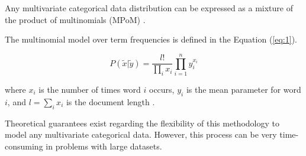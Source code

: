 Any multivariate categorical data distribution can be expressed as a mixture of the product of multinomials (MPoM) \citep{dunson2009nonparametric}.

The multinomial model over term frequencies is defined in the Equation (\ref{eq:1}).

\begin{equation} \label{eq:1}
    P(\tilde{x}|\tilde{y}) =\frac{l!}{\prod _i x_{i}}\prod_{i=1}^{n}y_{i}^{x_{i}}
\end{equation}

where \(x_{i}\) is the number of times word \(i\) occurs, \(y_{i}\) is the mean parameter for word \(i\), and \(l=\sum _{i} x_{i}\) is the document length \citep{rennie2005mixtures}.


Theoretical guarantees exist regarding the flexibility of this methodology to model any multivariate categorical data. However, this process can be very time-consuming in problems with large datasets.





